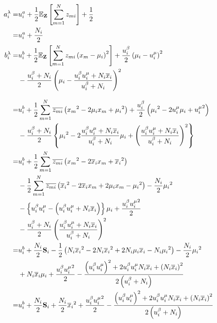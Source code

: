 \begin{align}
  a_i^\lambda  =&  u_i^a + \frac{1}{2} \mathbb{E}_{\bf Z}\left[ \sum_{m=1}^N z_{mi} \right] + \frac{1}{2}  \\
  =&  u_i^a + \frac{N_i}{2}  \\
  b_i^\lambda  =&  u_i^b + \frac{1}{2} \mathbb{E}_{\bf Z}\left[ \sum_{m=1}^N z_{mi} \left( {x_m} - \mu_i \right)^2 \right]  
      + \frac{u_i^\beta}{2} \left( \mu_i - u_i^\mu \right)^2  \notag  \\  
    &  - \frac{u_i^\beta + N_i}{2} \left( \mu_i - \frac{u_i^\beta u_i^\mu + N_i \overline{x}_i}{u_i^\beta + N_i} \right)^2  \\
%
\intertext{}
%
  =&  u_i^b + \frac{1}{2} \sum_{m=1}^N \overline{z_{mi}} \left( {x_m}^2 - 2 \mu_i x_m + {\mu_i}^2 \right)  + \frac{u_i^\beta}{2} \left( {\mu_i}^2 - 2 u_i^\mu \mu_i + {u_i^\mu}^2 \right)  \notag  \\
    &  - \frac{u_i^\beta + N_i}{2} \left\{ {\mu_i}^2 - 2 \frac{u_i^\beta u_i^\mu + N_i \overline{x}_i}{u_i^\beta + N_i} \mu_i + \left( \frac{u_i^\beta u_i^\mu + N_i \overline{x}_i}{u_i^\beta + N_i} \right)^2 \right\}  \\
%
  =&  u_i^b + \frac{1}{2} \sum_{m=1}^N \overline{z_{mi}} \left( {x_m}^2 - 2 \overline{x}_i x_m + {\overline{x}_i}^2 \right)  \notag  \\  
    &  - \frac{1}{2} \sum_{m=1}^N \overline{z_{mi}} \left( {\overline{x}_i}^2 - 2 \overline{x}_i x_m + 2 \mu_i x_m - {\mu_i}^2 \right)  - \frac{N_i}{2} {\mu_i}^2  \notag  \\
  &  - \left\{ u_i^\beta u_i^\mu - \left( u_i^\beta u_i^\mu + N_i \overline{x}_i \right) \right\} \mu_i  %
    +  \frac{u_i^\beta {u_i^\mu}^2}{2}  \notag  \\  
  &  - \frac{u_i^\beta + N_i}{2} \left( \frac{u_i^\beta u_i^\mu + N_i \overline{x}_i}{u_i^\beta + N_i} \right)^2  \\
%
  =&  u_i^b + \frac{N_i}{2} {\bf S}_i  - \frac{1}{2} \left( N_i {\overline{x}_i}^2 - 2 N_i {\overline{x}_i}^2 + 2 N_i \mu_i \overline{x}_i - N_i {\mu_i}^2 \right)  
    - \frac{N_i}{2} {\mu_i}^2  \notag  \\
    &  + N_i \overline{x}_i \mu_i  +  \frac{u_i^\beta {u_i^\mu}^2}{2} - \frac{ \left( u_i^\beta u_i^\mu \right)^2 + 2 u_i^\beta u_i^\mu N_i \overline{x}_i + \left( N_i \overline{x}_i \right)^2}{2 \left( u_i^\beta + N_i \right) }  \\
%
  =&  u_i^b + \frac{N_i}{2} {\bf S}_i  + \frac{N_i}{2} {\overline{x}_i}^2  +  \frac{u_i^\beta {u_i^\mu}^2}{2} - \frac{ \left( u_i^\beta u_i^\mu \right)^2 + 2 u_i^\beta u_i^\mu N_i \overline{x}_i + \left( N_i \overline{x}_i \right)^2}{2 \left( u_i^\beta + N_i \right) }  \\

\end{align}
